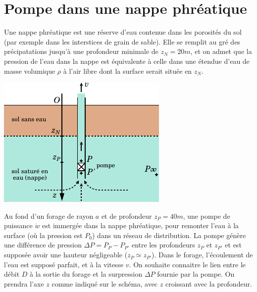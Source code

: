 \documentclass{report}
\begin{document}
\section*{Pompe dans une nappe phréatique}

Une nappe phréatique est une réserve d'eau contenue dans les porosités du sol (par exemple dans les interstices de grain de sable). Elle se remplit au gré des précipatations jusqu'à une profondeur minimale de $z_N=20m$, et on admet que la pression de l'eau dans la nappe est équivalente à celle dans une étendue d'eau de masse volumique $\rho$ à l'air libre dont la surface serait située en $z_N$.

\begin{center}
	\includegraphics[scale=1.4]{meca_flu9.pdf}
\end{center}

Au fond d'un forage de rayon $a$ et de profondeur $z_P=40m$, une pompe de puissance $\dot{w}$ est immergée dans la nappe phréatique, pour remonter l'eau à la surface (où la pression est $P_0$) dans un réseau de distribution. La pompe génère une différence de pression $\Delta P=P_P-P_{P'}$ entre les profondeurs $z_P$ et $z_{P'}$ et est supposée avoir une hauteur négligeable ($z_P \simeq z_{P'}$). Dans le forage, l'écoulement de l'eau est supposé parfait, et à la vitesse $v$. On souhaite connaitre le lien entre le débit $D$ à la sortie du forage et la surpression $\Delta P$ fournie par la pompe. On prendra l'axe $z$ comme indiqué sur le schéma, avec $z$ croissant avec la profondeur.
\end{document}
